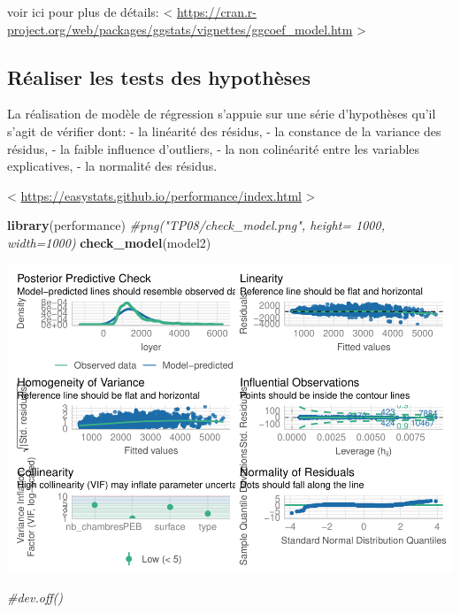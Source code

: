 \documentclass[
]{book}
\newenvironment{Shaded}{\begin{snugshade}}{\end{snugshade}}
\newcommand{\CommentTok}[1]{\textcolor[rgb]{0.56,0.35,0.01}{\textit{#1}}}
\newcommand{\FunctionTok}[1]{\textcolor[rgb]{0.13,0.29,0.53}{\textbf{#1}}}
\newcommand{\NormalTok}[1]{#1}
\begin{document}
voir ici pour plus de détails: \textless{}
\url{https://cran.r-project.org/web/packages/ggstats/vignettes/ggcoef_model.htm}
\textgreater{}

\hypertarget{ruxe9aliser-les-tests-des-hypothuxe8ses}{%
\subsection{Réaliser les tests des hypothèses}\label{ruxe9aliser-les-tests-des-hypothuxe8ses}}

La réalisation de modèle de régression s'appuie sur une série
d'hypothèses qu'il s'agit de vérifier dont: - la linéarité des
résidus, - la constance de la variance des résidus, - la faible
influence d'outliers, - la non colinéarité entre les variables
explicatives, - la normalité des résidus.

\textless{} \url{https://easystats.github.io/performance/index.html} \textgreater{}

\begin{Shaded}
\begin{Highlighting}[]
\FunctionTok{library}\NormalTok{(performance)}
\CommentTok{\#png("TP08/check\_model.png", height= 1000, width=1000)}
\FunctionTok{check\_model}\NormalTok{(model2)}
\end{Highlighting}
\end{Shaded}

\includegraphics{bookdown-demo_files/figure-latex/unnamed-chunk-21-1.pdf}

\begin{Shaded}
\begin{Highlighting}[]
\CommentTok{\#dev.off()}
\end{Highlighting}
\end{Shaded}
\end{document}
